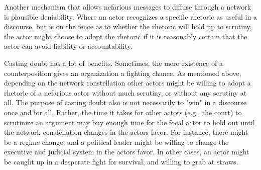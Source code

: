 Another mechanism that allows nefarious messages to diffuse through a network is plausible deniability. Where an actor recognizes a specific rhetoric \citep[cf.][]{Zbaracki1998} as useful in a discourse, but is on the fence as to whether the rhetoric will hold up to scrutiny, the actor might choose to adopt the rhetoric if it is reasonably certain that the actor can avoid liability or accountability.

Casting doubt has a lot of benefits. Sometimes, the mere existence of a counterposition gives an organization a fighting chance. As mentioned above, depending on the network constellation other actors might be willing to adopt a rhetoric of a nefarious actor without much scrutiny, or without any scrutiny at all. The purpose of casting doubt also is not necessarily to "win" in a discourse once and for all. Rather, the time it takes for other actors (e.g., the court) to scrutinize an argument may buy enough time for the focal actor to hold out until the network constellation changes in the actors favor. For instance, there might be a regime change, and a political leader might be willing to change the executive and judicial system in the actors favor. In other cases, an actor might be caught up in a desperate fight for survival, and willing to grab at straws.